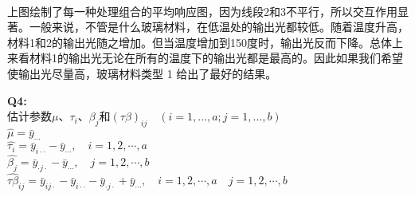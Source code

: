 \documentclass[11pt]{ctexart}
\begin{document}
    \begin{center}
    \end{center}
    { \hspace*{\fill} \\}
    
    上图绘制了每一种处理组合的平均响应图，因为线段2和3不平行，所以交互作用显著。一般来说，不管是什么玻璃材料，在低温处的输出光都较低。随着温度升高，材料1和2的输出光随之增加。但当温度增加到150度时，输出光反而下降。总体上来看材料1的输出光无论在所有的温度下的输出光都是最高的。因此如果我们希望使输出光尽量高，玻璃材料类型
1 给出了最好的结果。

    \textbf{Q4:}\\
估计参数\(\mu\)、\(\tau_i\)、\(\beta_j\)和\((\tau\beta)_{ij}\quad(i=1,...,a;j=1,...,b)\)\\
\(\hat{\mu}=\bar{y}_{\cdots}\)\\
\(\hat{\tau_i}=\bar{y}_{i\cdot\cdot}-\bar{y}_{\cdots},\quad i = 1,2,\cdots,a\)\\
\(\hat{\beta_j}=\bar{y}_{\cdot j\cdot}-\bar{y}_{\cdots},\quad j = 1,2,\cdots,b\)\\
\(\hat{\tau\beta}_{ij}=\bar{y}_{ij\cdot}-\bar{y}_{i\cdot\cdot}-\bar{y}_{\cdot j\cdot}+\bar{y}_{\cdots},\quad i = 1,2,\cdots,a\quad j = 1,2,\cdots,b\)
\end{document}
